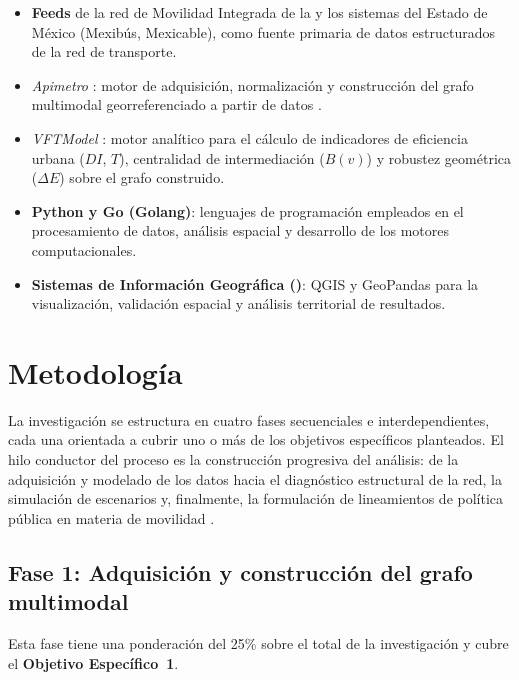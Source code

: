 \begin{itemize}
    \item \textbf{Feeds \gtfs{}} de la red de Movilidad Integrada de la \cdmx{} y
    los sistemas del Estado de México (Mexibús, Mexicable), como fuente primaria
    de datos estructurados de la red de transporte.
    \item \textit{Apimetro} \parencite{cabrera2025apimetro}: motor de adquisición,
    normalización y construcción del grafo multimodal georreferenciado a partir de
    datos \gtfs{}.
    \item \textit{VFTModel} \parencite{cabrera2026VFTModel}: motor analítico para el
    cálculo de indicadores de eficiencia urbana ($DI$, $T$), centralidad de
    intermediación ($B(v)$) y robustez geométrica ($\Delta E$) sobre el grafo
    construido.
    \item \textbf{Python y Go (Golang)}: lenguajes de programación empleados en el
    procesamiento de datos, análisis espacial y desarrollo de los motores
    computacionales.
    \item \textbf{Sistemas de Información Geográfica (\gis{})}: QGIS y GeoPandas
    para la visualización, validación espacial y análisis territorial de resultados.
\end{itemize}

\section{Metodología}
\label{sec:metodologia}

La investigación se estructura en cuatro fases secuenciales e interdependientes,
cada una orientada a cubrir uno o más de los objetivos específicos planteados. El
hilo conductor del proceso es la construcción progresiva del análisis: de la
adquisición y modelado de los datos hacia el diagnóstico estructural de la red, la
simulación de escenarios y, finalmente, la formulación de lineamientos de política
pública en materia de movilidad \parencite{allauca2023}.

\subsection{Fase 1: Adquisición y construcción del grafo multimodal}
\label{subsec:fase1}

Esta fase tiene una ponderación del 25\% sobre el total de la investigación y cubre
el \textbf{Objetivo Específico~1}.

